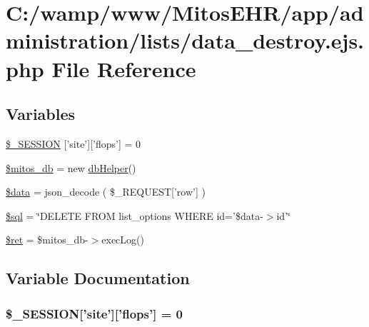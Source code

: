 \hypertarget{administration_2lists_2data__destroy_8ejs_8php}{\section{\-C\-:/wamp/www/\-Mitos\-E\-H\-R/app/administration/lists/data\-\_\-destroy.ejs.\-php \-File \-Reference}
\label{administration_2lists_2data__destroy_8ejs_8php}
}
\subsection*{\-Variables}
\begin{DoxyCompactItemize}
\item 
\hyperlink{administration_2lists_2data__destroy_8ejs_8php_a99fda8552a3e58235643b79f5af3ded8}{\$\-\_\-\-S\-E\-S\-S\-I\-O\-N} \mbox{[}'site'\mbox{]}\mbox{[}'flops'\mbox{]} = 0
\item 
\hyperlink{administration_2lists_2data__destroy_8ejs_8php_ab5d961f93efe4e2e8d8374f01dd6c65a}{\$mitos\-\_\-db} = new \hyperlink{classdb_helper}{db\-Helper}()
\item 
\hyperlink{administration_2lists_2data__destroy_8ejs_8php_a6efc15b5a2314dd4b5aaa556a375c6d6}{\$data} = json\-\_\-decode ( \$\-\_\-\-R\-E\-Q\-U\-E\-S\-T\mbox{[}'row'\mbox{]} )
\item 
\hyperlink{administration_2lists_2data__destroy_8ejs_8php_a047170d6020a882807665812a27e2525}{\$sql} = \char`\"{}\-D\-E\-L\-E\-T\-E \-F\-R\-O\-M list\-\_\-options \-W\-H\-E\-R\-E id='\$data-\/$>$id'\char`\"{}
\item 
\hyperlink{administration_2lists_2data__destroy_8ejs_8php_affd9e3eb0aad0a7ca42912cd925f148c}{\$ret} = \$mitos\-\_\-db-\/$>$exec\-Log()
\end{DoxyCompactItemize}


\subsection{\-Variable \-Documentation}
\hypertarget{administration_2lists_2data__destroy_8ejs_8php_a99fda8552a3e58235643b79f5af3ded8}{
\subsubsection[{\$\-\_\-\-S\-E\-S\-S\-I\-O\-N}]{\setlength{\rightskip}{0pt plus 5cm}\$\-\_\-\-S\-E\-S\-S\-I\-O\-N\mbox{[}'site'\mbox{]}\mbox{[}'flops'\mbox{]} = 0}}\label{administration_2lists_2data__destroy_8ejs_8php_a99fda8552a3e58235643b79f5af3ded8}


